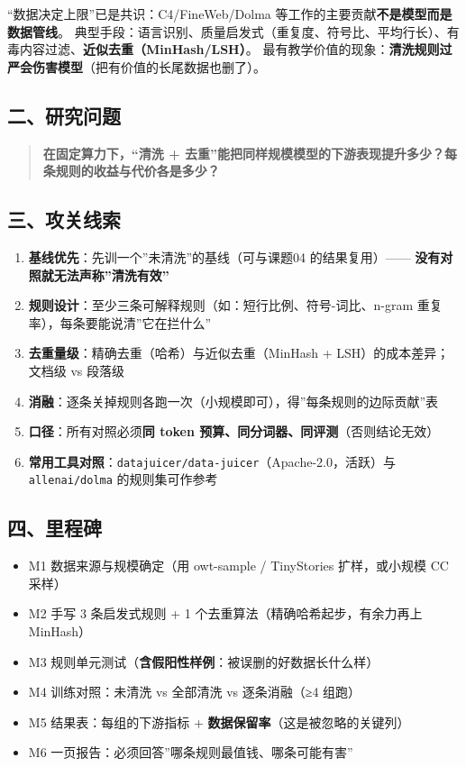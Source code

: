 \documentclass[
  chinese,
  11pt,
]{ctexart}
\providecommand{\tightlist}{%
  \setlength{\itemsep}{0pt}\setlength{\parskip}{0pt}}
\begin{document}
``数据决定上限''已是共识：C4/FineWeb/Dolma 等工作的主要贡献\textbf{不是模型而是数据管线}。 典型手段：语言识别、质量启发式（重复度、符号比、平均行长）、有毒内容过滤、\textbf{近似去重（MinHash/LSH）}。 最有教学价值的现象：\textbf{清洗规则过严会伤害模型}（把有价值的长尾数据也删了）。

\subsection{二、研究问题}\label{ux4e8cux7814ux7a76ux95eeux9898-1}

\begin{quote}
\textbf{在固定算力下，``清洗 + 去重''能把同样规模模型的下游表现提升多少？每条规则的收益与代价各是多少？}
\end{quote}

\subsection{三、攻关线索}\label{ux4e09ux653bux5173ux7ebfux7d22-5}

\begin{enumerate}
\def\labelenumi{\arabic{enumi}.}
\tightlist
\item
  \textbf{基线优先}：先训一个''未清洗''的基线（可与课题04 的结果复用）------ \textbf{没有对照就无法声称''清洗有效''}
\item
  \textbf{规则设计}：至少三条可解释规则（如：短行比例、符号-词比、n-gram 重复率），每条要能说清''它在拦什么''
\item
  \textbf{去重量级}：精确去重（哈希）与近似去重（MinHash + LSH）的成本差异；文档级 vs 段落级
\item
  \textbf{消融}：逐条关掉规则各跑一次（小规模即可），得''每条规则的边际贡献''表
\item
  \textbf{口径}：所有对照必须\textbf{同 token 预算、同分词器、同评测}（否则结论无效）
\item
  \textbf{常用工具对照}：\texttt{datajuicer/data-juicer}（Apache-2.0，活跃）与 \texttt{allenai/dolma} 的规则集可作参考
\end{enumerate}

\subsection{四、里程碑}\label{ux56dbux91ccux7a0bux7891-5}

\begin{itemize}
\tightlist
\item[$\square$]
  M1 数据来源与规模确定（用 owt-sample / TinyStories 扩样，或小规模 CC 采样）
\item[$\square$]
  M2 手写 3 条启发式规则 + 1 个去重算法（精确哈希起步，有余力再上 MinHash）
\item[$\square$]
  M3 规则单元测试（\textbf{含假阳性样例}：被误删的好数据长什么样）
\item[$\square$]
  M4 训练对照：未清洗 vs 全部清洗 vs 逐条消融（≥4 组跑）
\item[$\square$]
  M5 结果表：每组的下游指标 + \textbf{数据保留率}（这是被忽略的关键列）
\item[$\square$]
  M6 一页报告：必须回答''哪条规则最值钱、哪条可能有害''
\end{itemize}
\end{document}
